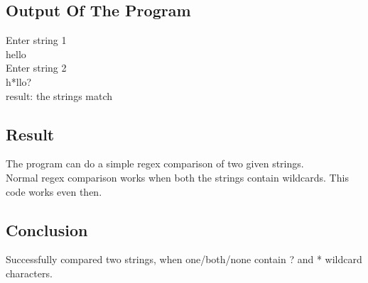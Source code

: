 \documentclass[paper=a4, fontsize=11pt]{scrartcl} %
\numberwithin{equation}{section} %
\numberwithin{figure}{section} %
\numberwithin{table}{section} %
\begin{document}
\subsection{Output Of The Program}
Enter string 1\\
hello\\
Enter string 2\\
h*llo?\\
result: the strings match\\

\subsection{Result}
The program can do a simple regex comparison of two given strings.\\
Normal regex comparison works when both the strings contain wildcards. This code works even then.

\subsection{Conclusion}
Successfully compared two strings, when one/both/none contain ? and * wildcard characters.
\end{document}
